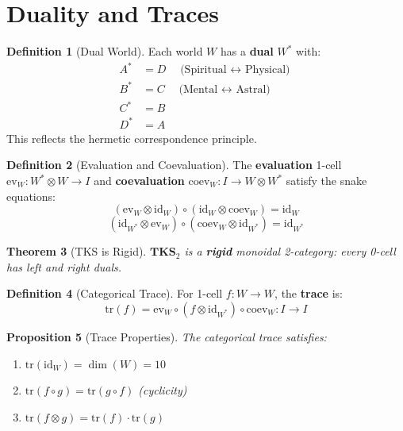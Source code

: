 \documentclass[11pt,twoside,openright]{book}
\theoremstyle{definition}
\newtheorem{definition}{Definition}[chapter]
\theoremstyle{plain}
\newtheorem{theorem}[definition]{Theorem}
\newtheorem{proposition}[definition]{Proposition}
\theoremstyle{remark}
\begin{document}
\section{Duality and Traces}

\begin{definition}[Dual World]
\label{def:dual-world}
Each world $W$ has a \textbf{dual} $W^*$ with:
\begin{align}
A^* &= D \quad \text{(Spiritual $\leftrightarrow$ Physical)} \\
B^* &= C \quad \text{(Mental $\leftrightarrow$ Astral)} \\
C^* &= B \\
D^* &= A
\end{align}
This reflects the hermetic correspondence principle.
\end{definition}

\begin{definition}[Evaluation and Coevaluation]
\label{def:eval-coeval}
The \textbf{evaluation} 1-cell $\mathrm{ev}_W : W^* \otimes W \to I$ and \textbf{coevaluation} $\mathrm{coev}_W : I \to W \otimes W^*$ satisfy the snake equations:
\[
(\mathrm{ev}_W \otimes \mathrm{id}_W) \circ (\mathrm{id}_W \otimes \mathrm{coev}_W) = \mathrm{id}_W
\]
\[
(\mathrm{id}_{W^*} \otimes \mathrm{ev}_W) \circ (\mathrm{coev}_W \otimes \mathrm{id}_{W^*}) = \mathrm{id}_{W^*}
\]
\end{definition}

\begin{theorem}[TKS is Rigid]
\label{thm:tks-rigid}
$\mathbf{TKS}_2$ is a \textbf{rigid} monoidal 2-category: every 0-cell has left and right duals.
\end{theorem}

\begin{definition}[Categorical Trace]
\label{def:cat-trace}
For 1-cell $f : W \to W$, the \textbf{trace} is:
\[
\mathrm{tr}(f) = \mathrm{ev}_W \circ (f \otimes \mathrm{id}_{W^*}) \circ \mathrm{coev}_W : I \to I
\]
\end{definition}

\begin{proposition}[Trace Properties]
\label{prop:trace-props}
The categorical trace satisfies:
\begin{enumerate}
  \item $\mathrm{tr}(\mathrm{id}_W) = \dim(W) = 10$
  \item $\mathrm{tr}(f \circ g) = \mathrm{tr}(g \circ f)$ (cyclicity)
  \item $\mathrm{tr}(f \otimes g) = \mathrm{tr}(f) \cdot \mathrm{tr}(g)$
\end{enumerate}
\end{proposition}
\end{document}
